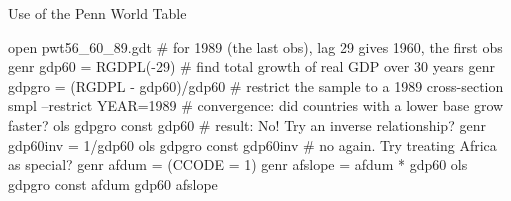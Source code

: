 \begin{script}[htbp]
  \caption{Use of the Penn World Table}
  \label{examp-pwt}
\begin{code}
          open pwt56_60_89.gdt 
          # for 1989 (the last obs), lag 29 gives 1960, the first obs 
          genr gdp60 = RGDPL(-29) 
          # find total growth of real GDP over 30 years
          genr gdpgro = (RGDPL - gdp60)/gdp60
          # restrict the sample to a 1989 cross-section 
          smpl --restrict YEAR=1989 
          # convergence: did countries with a lower base grow faster?  
          ols gdpgro const gdp60 
          # result: No! Try an inverse relationship?
          genr gdp60inv = 1/gdp60 
          ols gdpgro const gdp60inv 
          # no again.  Try treating Africa as special? 
          genr afdum = (CCODE = 1)
          genr afslope = afdum * gdp60 
          ols gdpgro const afdum gdp60 afslope 
\end{code}
\end{script}



